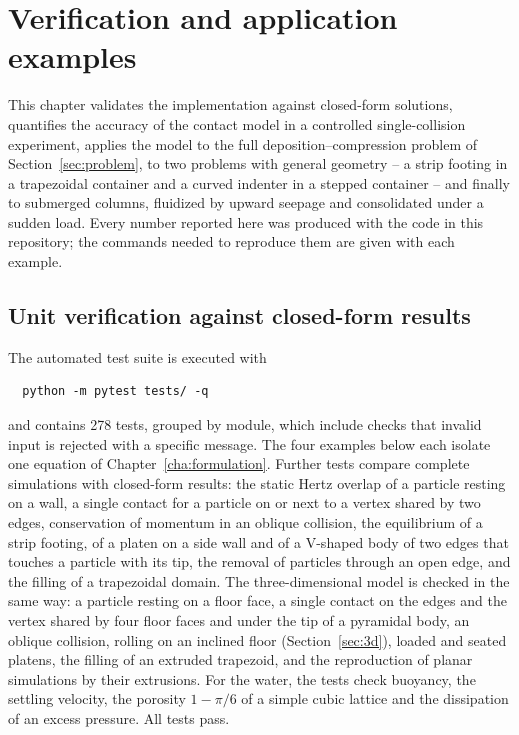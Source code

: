 \chapter{Verification and application examples}
\label{cha:examples}

This chapter validates the implementation against closed-form solutions,
quantifies the accuracy of the contact model in a controlled single-collision
experiment, applies the model to the full deposition--compression problem of
Section~\ref{sec:problem}, to two problems with general geometry -- a strip
footing in a trapezoidal container and a curved indenter in a stepped
container -- and finally to submerged columns, fluidized by upward seepage and
consolidated under a sudden load.  Every number reported here was produced
with the code in this repository; the commands needed to reproduce them are
given with each example.

\section{Unit verification against closed-form results}
\label{sec:unit-tests}

The automated test suite is executed with
\begin{verbatim}
  python -m pytest tests/ -q
\end{verbatim}
and contains \num{278} tests, grouped by module, which include checks that
invalid input is rejected with a specific message.  The four examples below each
isolate one equation of Chapter~\ref{cha:formulation}.  Further tests compare
complete simulations with closed-form results: the static Hertz overlap of a
particle resting on a wall, a single contact for a particle on or next to a
vertex shared by two edges, conservation of momentum in an oblique collision,
the equilibrium of a strip footing, of a platen on a side wall and of a
V-shaped body of two edges that touches a particle with its tip, the removal of
particles through an open edge, and the filling of a trapezoidal domain.
The three-dimensional model is checked in the same way: a particle resting on a floor face, a single contact on the edges and the vertex shared by four floor faces and under the tip of a pyramidal body, an oblique collision, rolling on an inclined floor (Section~\ref{sec:3d}), loaded and seated platens, the filling of an extruded trapezoid, and the reproduction of planar simulations by their extrusions.
For the water, the tests check buoyancy, the settling velocity, the porosity $1-\pi/6$ of a simple cubic lattice and the dissipation of an excess pressure.
All tests pass.

